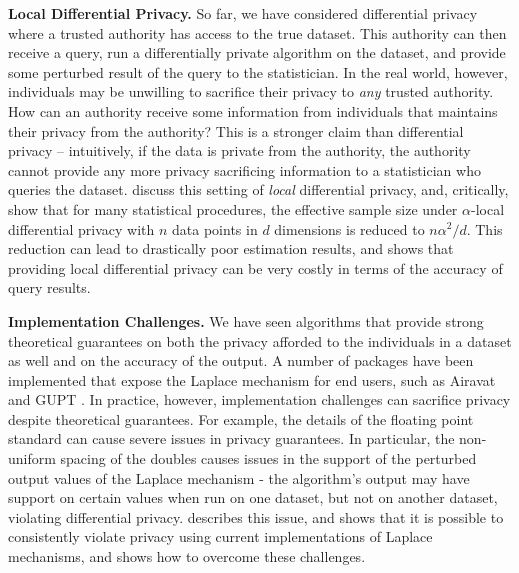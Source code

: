 \documentclass{article} %
\begin{document}
\textbf{Local Differential Privacy.} So far, we have considered differential
privacy where a trusted authority has access to the true dataset. This authority
can then receive a query, run a differentially private algorithm on the dataset,
and provide some perturbed result of the query to the statistician. In the real
world, however, individuals may be unwilling to sacrifice their privacy to
\textit{any} trusted authority. How can an authority receive some information
from individuals that maintains their privacy from the authority? This is a
stronger claim than differential privacy -- intuitively, if the data is private
from the authority, the authority cannot provide any more privacy sacrificing
information to a statistician who queries the dataset. \cite{duchi2013local}
discuss this setting of \textit{local} differential privacy, and, critically,
show that for many statistical procedures, the effective sample size under
$\alpha$-local differential privacy with $n$ data points in $d$ dimensions is
reduced to $n \alpha^2 / d$. This reduction can lead to drastically poor
estimation results, and shows that providing local differential privacy can be
very costly in terms of the accuracy of query results.

\textbf{Implementation Challenges.} We have seen algorithms that provide
strong theoretical guarantees on both the privacy afforded to the individuals in
a dataset as well and on the accuracy of the output. A number of packages have
been implemented that expose the Laplace mechanism for end users, such as
Airavat \cite{mohan2012gupt} and GUPT \cite{roy2010airavat}. In practice,
however, implementation challenges can sacrifice privacy despite theoretical
guarantees. For example, the details of the floating point standard can cause
severe issues in privacy guarantees. In particular, the non-uniform spacing of
the doubles causes issues in the support of the perturbed output values of the
Laplace mechanism - the algorithm's output may have support on certain values
when run on one dataset, but not on another dataset, violating differential
privacy.  \cite{mironov2012significance} describes this issue, and shows that it
is possible to consistently violate privacy using current implementations of
Laplace mechanisms, and shows how to overcome these challenges.
\end{document}
